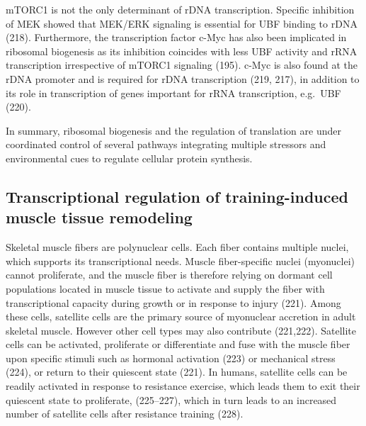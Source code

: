 \documentclass[twoside,10pt]{gihclass} %
\begin{document}
mTORC1 is not the only determinant of rDNA transcription. Specific inhibition of MEK showed that MEK/ERK signaling is essential for UBF binding to rDNA
(218).
Furthermore, the transcription factor c-Myc has also been implicated in ribosomal biogenesis as its inhibition coincides with less UBF activity and rRNA transcription irrespective of mTORC1 signaling
(195).
c-Myc is also found at the rDNA promoter and is required for rDNA transcription
(219, 217),
in addition to its role in transcription of genes important for rRNA transcription, e.g.~UBF
(220).

In summary, ribosomal biogenesis and the regulation of translation are under coordinated control of several pathways integrating multiple stressors and environmental cues to regulate cellular protein synthesis.

\hypertarget{transcriptional-regulation-of-training-induced-muscle-tissue-remodeling}{%
\subsection{Transcriptional regulation of training-induced muscle tissue remodeling}\label{transcriptional-regulation-of-training-induced-muscle-tissue-remodeling}}

Skeletal muscle fibers are polynuclear cells. Each fiber contains multiple nuclei, which supports its transcriptional needs. Muscle fiber-specific nuclei (myonuclei) cannot proliferate, and the muscle fiber is therefore relying on dormant cell populations located in muscle tissue to activate and supply the fiber with transcriptional capacity during growth or in response to injury
(221).
Among these cells, satellite cells are the primary source of myonuclear accretion in adult skeletal muscle.
However other cell types may also contribute
(221,222).
Satellite cells can be activated, proliferate or differentiate and fuse with the muscle fiber upon specific stimuli such as hormonal activation
(223)
or mechanical stress
(224),
or return to their quiescent state
(221).
In humans, satellite cells can be readily activated in response to resistance exercise, which leads them to exit their quiescent state to proliferate,
(225--227),
which in turn leads to an increased number of satellite cells after resistance training
(228).
\end{document}
